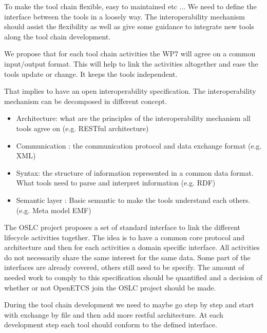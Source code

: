 To make the tool chain flexible, easy to maintained etc ... We need to
define the interface between the tools in a loosely way. The interoperability
mechanism should assist the flexibility as well as give some guidance
to integrate new tools along the tool chain development. 

We propose that for each tool chain activities the WP7 will agree on a
common input/output format. This will help to link the activities
altogether and ease the tools update or change.
It keeps the tools independent.

That implies to have an open interoperability specification.
The interoperability mechanism can be decomposed in different
concept.
\begin{itemize}
\item Architecture: what are the principles of the interoperability
  mechanism all tools agree on (e.g. RESTful architecture)
\item Communication : the communication protocol and data exchange
  format (e.g. XML)
\item Syntax: the structure of information represented in a common
  data format. What tools need to parse and interpret information
  (e.g. RDF)
\item Semantic layer : Basic semantic to make the tools understand
  each others. (e.g. Meta model EMF)
\end{itemize}

The OSLC project proposes a set of standard interface to link  the
different lifecycle activities together. The idea is to have a common
core protocol and architecture and then for each activities a
domain specific interface. All activities do not necessarily share the
same interest for the same data. Some part of the interfaces are
already covered, others still need to be specify. The amount of needed
work to comply to this specification should be quantified and a
decision of whether or not OpenETCS join the OSLC project should be
made.

During the tool chain development we need to maybe go step by step and
start with exchange by file and then add more restful architecture.
At each development step each tool should conform to the defined
interface.



